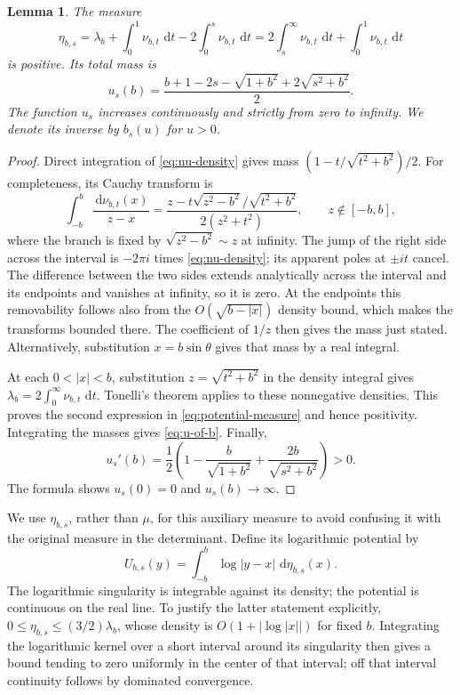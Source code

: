 \documentclass[11pt,letterpaper]{article}
\newtheorem{lemma}[lemma]{Lemma}
\theoremstyle{definition}
\newcommand{\dd}{\,\mathrm d}
\begin{document}
\begin{lemma}\label{lem:positive-potential}
The measure
\begin{equation}\label{eq:potential-measure}
 \eta_{b,s}
 =\lambda_b+\int_0^1\nu_{b,t}\,\dd t
                  -2\int_0^s\nu_{b,t}\,\dd t
 =2\int_s^\infty\nu_{b,t}\,\dd t+\int_0^1\nu_{b,t}\,\dd t
\end{equation}
is positive. Its total mass is
\begin{equation}\label{eq:u-of-b}
 u_s(b)=
 \frac{b+1-2s-\sqrt{1+b^2}+2\sqrt{s^2+b^2}}2.
\end{equation}
The function $u_s$ increases continuously and strictly from zero to
infinity. We denote its inverse by $b_s(u)$ for $u>0$.
\end{lemma}
\begin{proof}
Direct integration of \eqref{eq:nu-density} gives mass
$(1-t/\sqrt{t^2+b^2})/2$. For completeness, its Cauchy transform is
\begin{equation}\label{eq:cauchy-nu}
 \int_{-b}^{b}\frac{\dd\nu_{b,t}(x)}{z-x}
 =\frac{z-t\sqrt{z^2-b^2}/\sqrt{t^2+b^2}}{2(z^2+t^2)},
 \qquad z\notin[-b,b],
\end{equation}
where the branch is fixed by $\sqrt{z^2-b^2}\sim z$ at infinity.
The jump of the right side across the interval is $-2\pi i$ times
\eqref{eq:nu-density}; its apparent poles at $\pm it$ cancel. The difference
between the two sides extends analytically across the interval and its
endpoints and vanishes at infinity, so it is zero. At the endpoints this
removability follows also from the $O(\sqrt{b-|x|})$ density bound, which
makes the transforms bounded there. The coefficient of $1/z$
then gives the mass just stated. Alternatively, substitution $x=b\sin\theta$
gives that mass by a real integral.

At each $0<|x|<b$, substitution $z=\sqrt{t^2+b^2}$ in the density integral
gives $\lambda_b=2\int_0^\infty\nu_{b,t}\,\dd t$. Tonelli's theorem applies
to these nonnegative densities. This proves the second expression in
\eqref{eq:potential-measure} and hence positivity. Integrating the masses
gives \eqref{eq:u-of-b}. Finally,
\[
 u_s'(b)=\frac12\left(
  1-\frac b{\sqrt{1+b^2}}+\frac{2b}{\sqrt{s^2+b^2}}
 \right)>0.
\]
The formula shows $u_s(0)=0$ and $u_s(b)\to\infty$.
\end{proof}

We use $\eta_{b,s}$, rather than $\mu$, for this auxiliary measure to avoid
confusing it with the original measure in the determinant. Define its
logarithmic potential by
\[
 U_{b,s}(y)=\int_{-b}^{b}\log|y-x|\,\dd\eta_{b,s}(x).
\]
The logarithmic singularity is integrable against its density; the potential
is continuous on the real line. To justify the latter statement explicitly,
$0\le\eta_{b,s}\le(3/2)\lambda_b$, whose density is
$O(1+|\log|x||)$ for fixed $b$. Integrating the logarithmic kernel over a
short interval around its singularity then gives a bound tending to zero
uniformly in the center of that interval; off that interval continuity
follows by dominated convergence.
\end{document}
